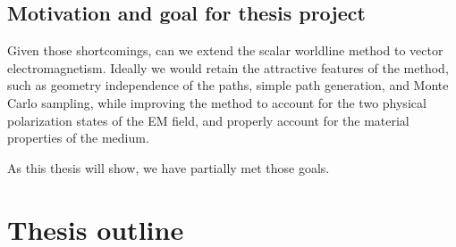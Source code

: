 \subsection{Motivation and goal for thesis project}

Given those shortcomings, can we extend the scalar worldline method to vector electromagnetism.
Ideally we would retain the attractive features of the method, such as geometry independence of the paths,
simple path generation, and Monte Carlo sampling, while improving the method to account for the two physical polarization
states of the EM field, and properly account for the material properties of the medium.  

As this thesis will show, we have partially met those goals.  

\section{Thesis outline}

